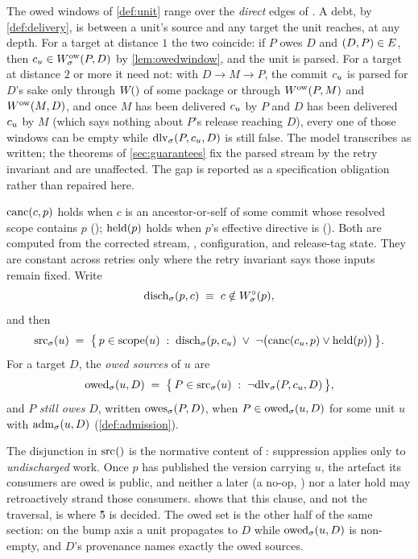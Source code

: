 \begin{remark}
\label{rem:owed-depth}
The owed windows of \cref{def:unit} range over the \emph{direct} edges of
\Edges{}. A debt, by \cref{def:delivery}, is between a unit's source and any
target the unit reaches, at any depth. For a target at distance $1$ the two
coincide: if $P$ owes $D$ and $(D,P) \in E$, then $c_{u} \in
W^{\mathrm{ow}}_{\sigma}(P,D)$ by \cref{lem:owedwindow}, and the unit is parsed. For a
target at distance $2$ or more it need not: with $D \to M \to P$, the commit
$c_{u}$ is parsed for $D$'s sake only through $W_{}()$ of some package or
through $W^{\mathrm{ow}}_{}(P,M)$ and $W^{\mathrm{ow}}_{}(M,D)$, and once $M$ has been delivered
$c_{u}$ by $P$ and $D$ has been delivered $c_{u}$ by $M$ (which says nothing
about $P$'s release reaching $D$), every one of those windows can be empty while
$\mathrm{dlv}_{\sigma}(P,c_{u},D)$ is still false. The model transcribes
 as written; the theorems of \cref{sec:guarantees} fix the parsed
stream by the retry invariant and are unaffected. The gap is reported as a
specification obligation rather than repaired here.
\end{remark}

\begin{definition}
\label{def:sources}
$\mathrm{canc}(c,p)$ holds when $c$ is an ancestor-or-self of some  commit
whose resolved scope contains $p$ (); $\mathrm{held}(p)$ holds when $p$'s
effective  directive is  (). Both are
computed from the corrected stream, \Head{}, configuration, and release-tag state. They are constant across retries only where the retry invariant says those inputs remain fixed. Write
\[
  \mathrm{disch}_{\sigma}(p,c) \;\equiv\; c \notin W^{\circ}_{\sigma}(p),
\]
and then
\[
  \mathrm{src}_{\sigma}(u) \;=\;
    \bigl\{\, p \in \mathrm{scope}(u) \;:\;
       \mathrm{disch}_{\sigma}(p,c_{u}) \;\lor\;
       \lnot\bigl(\mathrm{canc}(c_{u},p) \lor \mathrm{held}(p)\bigr) \,\bigr\}.
\]
For a target $D$, the \emph{owed sources} of $u$ are
\[
  \mathrm{owed}_{\sigma}(u,D) \;=\;
    \bigl\{\, P \in \mathrm{src}_{\sigma}(u) \;:\; \lnot\mathrm{dlv}_{\sigma}(P,c_{u},D) \,\bigr\},
\]
and $P$ \emph{still owes} $D$, written $\mathrm{owes}_{\sigma}(P,D)$, when $P \in
\mathrm{owed}_{\sigma}(u,D)$ for some unit $u$ with $\mathrm{adm}_{\sigma}(u,D)$
(\cref{def:admission}).
\end{definition}

The disjunction in $\mathrm{src}_{}()$ is the normative content of : suppression applies
only to \emph{undischarged} work. Once $p$ has published the version carrying
$u$, the artefact its consumers are owed is public, and neither a later
 (a no-op, ) nor a later hold may retroactively strand
those consumers.  shows that this clause, and not the traversal, is
where \G{5} is decided. The owed set is the other half of the same section: on
the bump axis a unit propagates to $D$ while $\mathrm{owed}_{\sigma}(u,D)$ is non-empty,
and $D$'s provenance names exactly the owed sources.

